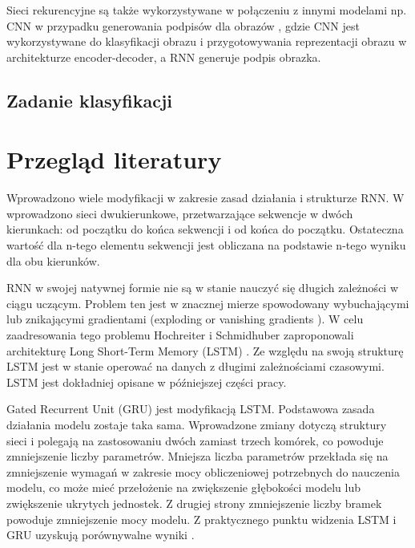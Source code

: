 \documentclass[oneside, mag]{mgr}
\begin{document}
Sieci rekurencyjne są także wykorzystywane w połączeniu z innymi modelami np. CNN w przypadku generowania podpisów dla obrazów \cite{DBLP:journals/corr/VinyalsTBE14}, gdzie CNN jest wykorzystywane do klasyfikacji obrazu i przygotowywania reprezentacji obrazu w architekturze encoder-decoder, a RNN generuje podpis obrazka.

\subsection{Zadanie klasyfikacji}

\cite{Goodfellow-et-al-2016}

\section{Przegląd literatury}

Wprowadzono wiele modyfikacji w zakresie zasad działania i strukturze RNN. 
W \cite{bidirectional} wprowadzono sieci dwukierunkowe, przetwarzające sekwencje w dwóch kierunkach: od początku do końca sekwencji i od końca do początku. Ostateczna wartość dla n-tego elementu sekwencji jest obliczana na podstawie n-tego wyniku dla obu kierunków.

RNN w swojej natywnej formie nie są w stanie nauczyć się długich zależności w ciągu uczącym. Problem ten jest w znacznej mierze spowodowany wybuchającymi lub znikającymi gradientami (exploding or vanishing gradients \cite{vanishing_gradient_RNN}). W celu zaadresowania tego problemu Hochreiter i Schmidhuber zaproponowali architekturę Long Short-Term Memory (LSTM) \cite{LSTM}. Ze względu na swoją strukturę LSTM jest w stanie operować na danych z długimi zależnościami czasowymi. LSTM jest dokładniej opisane w późniejszej części pracy.  

Gated Recurrent Unit (GRU) \cite{DBLP:journals/corr/ChungGCB15} jest modyfikacją LSTM. Podstawowa zasada działania modelu zostaje taka sama. Wprowadzone zmiany dotyczą struktury sieci i polegają na zastosowaniu dwóch zamiast trzech komórek, co powoduje zmniejszenie liczby parametrów. Mniejsza liczba parametrów przekłada się na zmniejszenie wymagań w zakresie mocy obliczeniowej potrzebnych do nauczenia modelu, co może mieć przełożenie na zwiększenie głębokości modelu lub zwiększenie ukrytych jednostek. Z drugiej strony zmniejszenie liczby bramek powoduje zmniejszenie mocy modelu. Z praktycznego punktu widzenia LSTM i GRU uzyskują porównywalne wyniki \cite{DBLP:journals/corr/ChungGCB14}.
\end{document}
